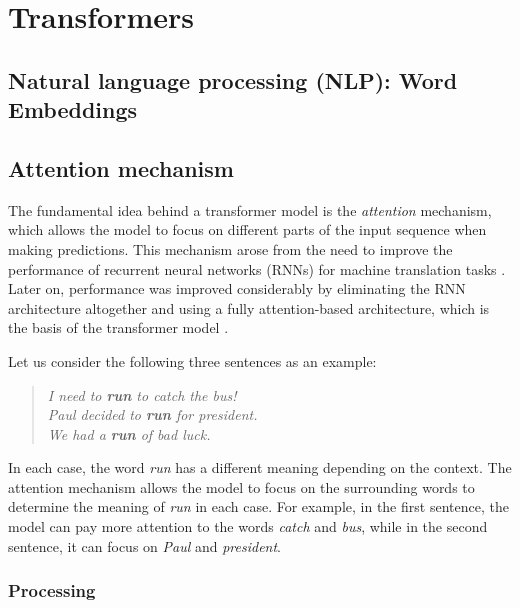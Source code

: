 \section{Transformers}\label{sec:transformers}

\subsection{Natural language processing (NLP): Word Embeddings}\label{subsec:nlp_word_embeddings}


\subsection{Attention mechanism}\label{subsec:attention_mechanism}

The fundamental idea behind a transformer model is the \emph{attention} mechanism, which allows the model to focus on different parts of the input sequence when making predictions. This mechanism arose from the need to improve the performance of recurrent neural networks (RNNs) for machine translation tasks \cite{bahdanauNeuralMachineTranslation2016}. Later on, performance was improved considerably by eliminating the RNN architecture altogether and using a fully attention-based architecture, which is the basis of the transformer model \cite{vaswaniAttentionAllYou2017}. 

Let us consider the following three sentences as an example:

\begin{quote}
    \textit{I need to \textbf{run} to catch the bus!}  \\
    \textit{Paul decided to \textbf{run} for president.} \\
    \textit{We had a \textbf{run} of bad luck.} 
\end{quote}

In each case, the word \textit{run} has a different meaning depending on the context. The attention mechanism allows the model to focus on the surrounding words to determine the meaning of \textit{run} in each case. For example, in the first sentence, the model can pay more attention to the words \textit{catch} and \textit{bus}, while in the second sentence, it can focus on \textit{Paul} and \textit{president}.

\subsubsection{Processing}\label{subsubsec:processing}

